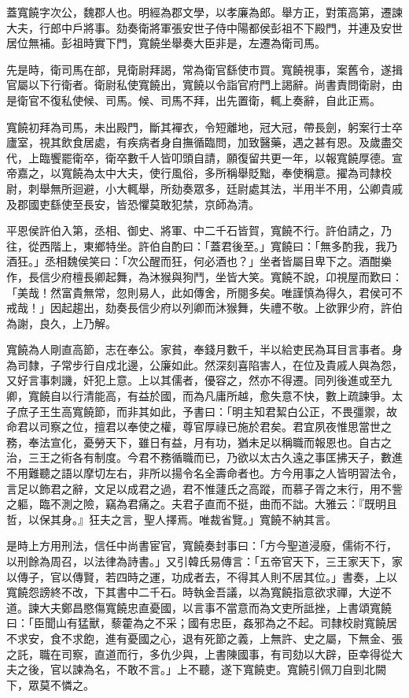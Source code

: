 
\begin{pinyinscope}
蓋寬饒字次公，魏郡人也。明經為郡文學，以孝廉為郎。舉方正，對策高第，遷諫大夫，行郎中戶將事。劾奏衛將軍張安世子侍中陽都侯彭祖不下殿門，并連及安世居位無補。彭祖時實下門，寬饒坐舉奏大臣非是，左遷為衛司馬。

先是時，衛司馬在部，見衛尉拜謁，常為衛官繇使巿買。寬饒視事，案舊令，遂揖官屬以下行衛者。衛尉私使寬饒出，寬饒以令詣官府門上謁辭。尚書責問衛尉，由是衛官不復私使候、司馬。候、司馬不拜，出先置衛，輒上奏辭，自此正焉。

寬饒初拜為司馬，未出殿門，斷其襌衣，令短離地，冠大冠，帶長劍，躬案行士卒廬室，視其飲食居處，有疾病者身自撫循臨問，加致醫藥，遇之甚有恩。及歲盡交代，上臨饗罷衛卒，衛卒數千人皆叩頭自請，願復留共更一年，以報寬饒厚德。宣帝嘉之，以寬饒為太中大夫，使行風俗，多所稱舉貶黜，奉使稱意。擢為司隸校尉，刺舉無所迴避，小大輒舉，所劾奏眾多，廷尉處其法，半用半不用，公卿貴戚及郡國吏繇使至長安，皆恐懼莫敢犯禁，京師為清。

平恩侯許伯入第，丞相、御史、將軍、中二千石皆賀，寬饒不行。許伯請之，乃往，從西階上，東鄉特坐。許伯自酌曰：「蓋君後至。」寬饒曰：「無多酌我，我乃酒狂。」丞相魏侯笑曰：「次公醒而狂，何必酒也？」坐者皆屬目卑下之。酒酣樂作，長信少府檀長卿起舞，為沐猴與狗鬥，坐皆大笑。寬饒不說，卬視屋而歎曰：「美哉！然富貴無常，忽則易人，此如傳舍，所閱多矣。唯謹慎為得久，君侯可不戒哉！」因起趨出，劾奏長信少府以列卿而沐猴舞，失禮不敬。上欲罪少府，許伯為謝，良久，上乃解。

寬饒為人剛直高節，志在奉公。家貧，奉錢月數千，半以給吏民為耳目言事者。身為司隸，子常步行自戍北邊，公廉如此。然深刻喜陷害人，在位及貴戚人與為怨，又好言事刺譏，奸犯上意。上以其儒者，優容之，然亦不得遷。同列後進或至九卿，寬饒自以行清能高，有益於國，而為凡庸所越，愈失意不快，數上疏諫爭。太子庶子王生高寬饒節，而非其如此，予書曰：「明主知君絜白公正，不畏彊禦，故命君以司察之位，擅君以奉使之權，尊官厚祿已施於君矣。君宜夙夜惟思當世之務，奉法宣化，憂勞天下，雖日有益，月有功，猶未足以稱職而報恩也。自古之治，三王之術各有制度。今君不務循職而已，乃欲以太古久遠之事匡拂天子，數進不用難聽之語以摩切左右，非所以揚令名全壽命者也。方今用事之人皆明習法令，言足以飾君之辭，文足以成君之過，君不惟蘧氏之高蹤，而慕子胥之末行，用不訾之軀，臨不測之險，竊為君痛之。夫君子直而不挺，曲而不詘。大雅云：『既明且哲，以保其身。』狂夫之言，聖人擇焉。唯裁省覽。」寬饒不納其言。

是時上方用刑法，信任中尚書宦官，寬饒奏封事曰：「方今聖道浸廢，儒術不行，以刑餘為周召，以法律為詩書。」又引韓氏易傳言：「五帝官天下，三王家天下，家以傳子，官以傳賢，若四時之運，功成者去，不得其人則不居其位。」書奏，上以寬饒怨謗終不改，下其書中二千石。時執金吾議，以為寬饒指意欲求禪，大逆不道。諫大夫鄭昌愍傷寬饒忠直憂國，以言事不當意而為文吏所詆挫，上書頌寬饒曰：「臣聞山有猛獸，藜藿為之不采；國有忠臣，姦邪為之不起。司隸校尉寬饒居不求安，食不求飽，進有憂國之心，退有死節之義，上無許、史之屬，下無金、張之託，職在司察，直道而行，多仇少與，上書陳國事，有司劾以大辟，臣幸得從大夫之後，官以諫為名，不敢不言。」上不聽，遂下寬饒吏。寬饒引佩刀自剄北闕下，眾莫不憐之。


\end{pinyinscope}
